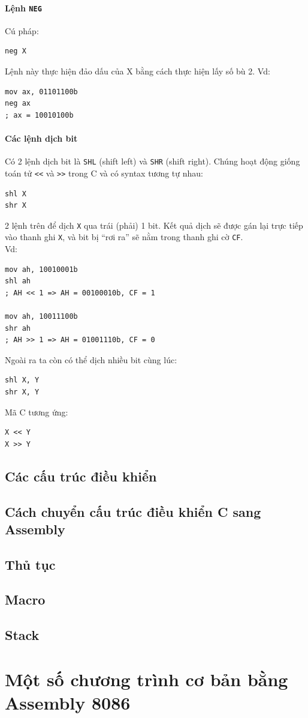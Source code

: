 \documentclass[12pt]{report}
\newcommand{\code}[1]{\texttt{#1}}
\begin{document}
\subsubsection{Lệnh \code{NEG}}
Cú pháp:
\begin{verbatim}
neg X
\end{verbatim}
Lệnh này thực hiện đảo dấu của X bằng cách thực hiện lấy số bù 2.
Vd:
\begin{verbatim}
mov ax, 01101100b
neg ax 
; ax = 10010100b
\end{verbatim}

\subsubsection{Các lệnh dịch bit}
Có 2 lệnh dịch bit là \code{SHL} (shift left) và \code{SHR} (shift right). Chúng hoạt động giống toán tử \verb#<<# và \verb#>># trong C và có syntax tương tự nhau:
\begin{verbatim}
shl X
shr X
\end{verbatim}
2 lệnh trên để dịch \code X qua trái (phải) 1 bit. Kết quả dịch sẽ được gán lại trực tiếp vào thanh ghi \code X, và bit bị ``rơi ra'' sẽ nằm trong thanh ghi cờ \code{CF}.\\
Vd:
\begin{verbatim}
mov ah, 10010001b
shl ah 
; AH << 1 => AH = 00100010b, CF = 1

mov ah, 10011100b
shr ah 
; AH >> 1 => AH = 01001110b, CF = 0
\end{verbatim}
Ngoài ra ta còn có thể dịch nhiều bit cùng lúc:
\begin{verbatim}
shl X, Y 
shr X, Y
\end{verbatim}
Mã C tương ứng:
\begin{verbatim}
X << Y 
X >> Y
\end{verbatim}

\section{Các cấu trúc điều khiển}

\section{Cách chuyển cấu trúc điều khiển C sang Assembly}

\section{Thủ tục}

\section{Macro}

\section{Stack}

\chapter{Một số chương trình cơ bản bằng Assembly 8086} \label{chapterBaiTap}



\renewcommand{\bibname}{Tài liệu tham khảo}


\end{document}
